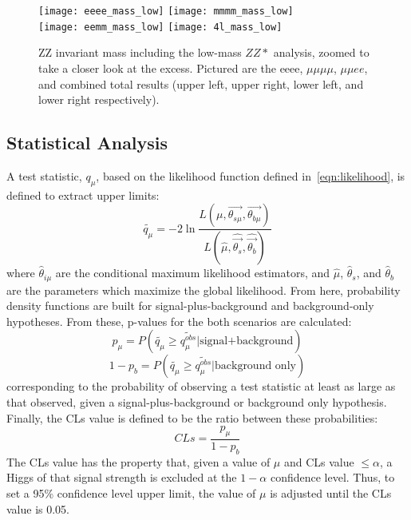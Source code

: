\begin{figure}[h]
\centering
\texttt{[image: eeee\_mass\_low]}
\texttt{[image: mmmm\_mass\_low]}\\
\texttt{[image: eemm\_mass\_low]}
\texttt{[image: 4l\_mass\_low]}
\caption[ZZ invariant mass including the low-mass $ZZ*$ analysis, zoomed to take a closer
look at the excess.]{ZZ invariant mass including the low-mass $ZZ*$ analysis, zoomed to take
a closer look at the excess. Pictured are
the eeee, $\mu\mu\mu\mu$, $\mu\mu e e$, and combined total results (upper left,
upper right, lower left, and lower right respectively).}
\label{fig:zzMass_higgs_low}
\end{figure}

\subsection{Statistical Analysis}
A test statistic, $q_\mu$, based on the likelihood function defined
in~\ref{eqn:likelihood}, is defined to extract upper limits:
\begin{equation}
    \tilde{q_\mu} = -2 \ln \frac{L (\mu, \vec{\theta_{s \mu}}, \vec{\theta_{b \mu}})}{L(\hat \mu,
    \hat{\vec{ \theta_{s}}}, \hat{\vec{ \theta_{b}}})}
\end{equation}
where $\hat \theta_{i \mu}$ are the conditional maximum likelihood estimators,
and $\hat \mu$, $\hat \theta_s$, and $\hat \theta_b$ are the parameters which
maximize the global likelihood.
From here, probability density functions are built for signal-plus-background
and background-only hypotheses. From these, p-values for the both scenarios are
calculated:
\begin{equation}
    p_\mu = P(\tilde{q_\mu} \ge \tilde{q_\mu^{obs}} |
    \textrm{signal+background})
\end{equation}
\begin{equation}
    1-p_b = P(\tilde{q_\mu} \ge \tilde{q_\mu^{obs}} |
    \textrm{background only})
\end{equation}
corresponding to the probability of observing a test statistic at least as large
as that observed, given a signal-plus-background or background only hypothesis.
Finally, the CLs value is defined to be the ratio between these probabilities:
\begin{equation}
    CLs = \frac{p_\mu}{1-p_b}
\end{equation}
The CLs value has the property that, given a value of $\mu$ and CLs value $\le
\alpha$, a Higgs of that signal strength is excluded at the $1-\alpha$
confidence level. Thus, to set a 95\% confidence level upper limit, the value of
$\mu$ is adjusted until the CLs value is 0.05.

